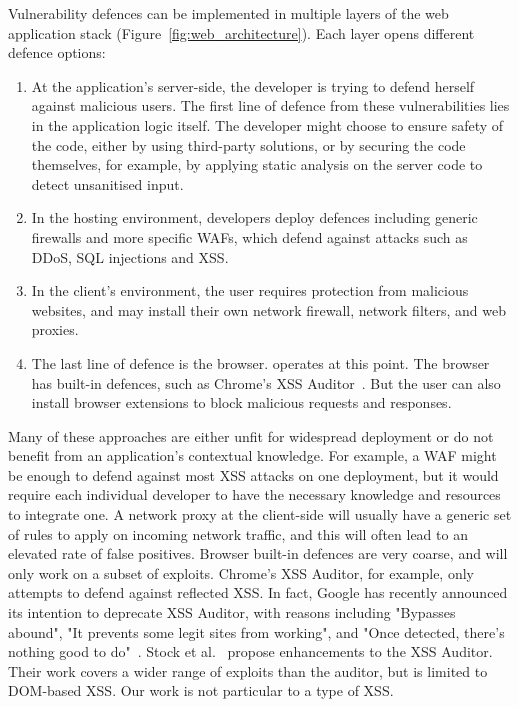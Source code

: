 Vulnerability defences can be implemented in multiple layers of the web application stack (Figure~\ref{fig:web_architecture}). Each layer opens different defence options:
\begin{enumerate}
	\item At the application's server-side, the developer is
          trying to defend herself against malicious users. The first
          line of defence from these vulnerabilities lies in the
          application logic itself. The developer might choose to
          ensure safety of the code, either by using third-party
          solutions, or by securing the code themselves, for example,
          by applying static analysis on the server code to detect
          unsanitised input.
	\item In the hosting environment, developers deploy
          defences including generic firewalls and more specific \acp{WAF}, which defend against attacks
          such as \ac{DDoS}, \ac{SQL} injections and \ac{XSS}.
	\item In the client's environment, the user requires protection from
          malicious websites, and may install their own network firewall,
          network filters, and web proxies.
	\item The last line of defence is the browser. \sys operates at this point.
          The browser has built-in defences, such as
          Chrome's \ac{XSS} Auditor~\cite{xssauditor}. But the user can also
          install browser extensions to block malicious requests and
          responses. %
\end{enumerate}

Many of these approaches are either unfit for widespread deployment or
do not benefit from an application's contextual knowledge. For
example, a \ac{WAF} might be enough to defend against most \ac{XSS} attacks on
one deployment, but it would require each individual developer to have
the necessary knowledge and resources to integrate one. A network
proxy at the client-side will usually have a generic set of rules to
apply on incoming network traffic, and this will often lead to an
elevated rate of false positives. Browser built-in defences are very
coarse, and will only work on a subset of exploits. Chrome's XSS
Auditor, for example, only attempts to defend against reflected
\ac{XSS}. In fact, Google has recently announced its intention to deprecate
XSS Auditor, with reasons including "Bypasses abound", "It prevents
some legit sites from working", and "Once detected, there’s nothing
good to do"~\cite{deprecatexssauditor}. Stock et
al.~\cite{Stock:2017:WTI:3241189.3241265} propose enhancements to the
XSS Auditor. Their work covers a wider range of exploits than the
auditor, but is limited to DOM-based \ac{XSS}. Our work is not particular
to a type of \ac{XSS}.

